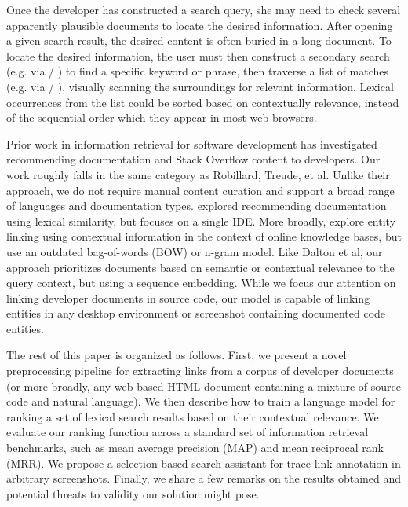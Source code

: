 \documentclass[sigconf,authordraft]{acmart}
\begin{document}
Once the developer has constructed a search query, she may need to check several apparently plausible documents to locate the desired information. After opening a given search result, the desired content is often buried in a long document. To locate the desired information, the user must then construct a secondary search (e.g. via \keys{\ctrl} / ) to find a specific keyword or phrase, then traverse a list of matches (e.g. via \keys{\return} / \keys{\shift + \return}), visually scanning the surroundings for relevant information. Lexical occurrences from the list could be sorted based on contextually relevance, instead of the sequential order which they appear in most web browsers.

Prior work in information retrieval for software development has investigated recommending documentation \citep{robillard2015recommending} and Stack Overflow content \citep{treude2016augmenting} to developers. Our work roughly falls in the same category as Robillard, Treude, et al. Unlike their approach, we do not require manual content curation and support a broad range of languages and documentation types. \citet{rahman2014towards} explored recommending documentation using lexical similarity, but focuses on a single IDE. More broadly, \citet{el2001linking, dalton2013neighborhood, dalton2014entity} explore entity linking using contextual information in the context of online knowledge bases, but use an outdated bag-of-words (BOW) or n-gram model. Like Dalton et al, our approach prioritizes documents based on semantic or contextual relevance to the query context, but using a sequence embedding. While we focus our attention on linking developer documents in source code, our model is capable of linking entities in any desktop environment or screenshot containing documented code entities.

The rest of this paper is organized as follows. First, we present a novel preprocessing pipeline for extracting links from a corpus of developer documents (or more broadly, any web-based HTML document containing a mixture of source code and natural language). We then describe how to train a language model for ranking a set of lexical search results based on their contextual relevance. We evaluate our ranking function across a standard set of information retrieval benchmarks, such as mean average precision (MAP) and mean reciprocal rank (MRR). We propose a selection-based search assistant for trace link annotation in arbitrary screenshots. Finally, we share a few remarks on the results obtained and potential threats to validity our solution might pose.
\end{document}
